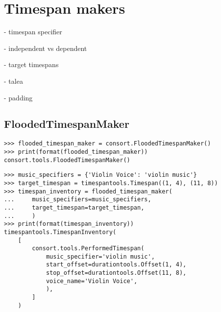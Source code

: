 \section{Timespan makers}

- timespan specifier

- independent vs dependent

- target timespans

- talea

- padding

\subsection{FloodedTimespanMaker} %

\begin{comment}
<abjad>
flooded_timespan_maker = consort.FloodedTimespanMaker()
print(format(flooded_timespan_maker))
</abjad>
\end{comment}

\begin{singlespacing}
\vspace{-0.5\baselineskip}
\begin{lstlisting}
>>> flooded_timespan_maker = consort.FloodedTimespanMaker()
>>> print(format(flooded_timespan_maker))
consort.tools.FloodedTimespanMaker()
\end{lstlisting}
\end{singlespacing}

\begin{comment}
<abjad>
music_specifiers = {'Violin Voice': 'violin music'}
target_timespan = timespantools.Timespan((1, 4), (11, 8))
timespan_inventory = flooded_timespan_maker(
    music_specifiers=music_specifiers,
    target_timespan=target_timespan,
    )
print(format(timespan_inventory))
</abjad>
\end{comment}

\begin{singlespacing}
\vspace{-0.5\baselineskip}
\begin{lstlisting}
>>> music_specifiers = {'Violin Voice': 'violin music'}
>>> target_timespan = timespantools.Timespan((1, 4), (11, 8))
>>> timespan_inventory = flooded_timespan_maker(
...     music_specifiers=music_specifiers,
...     target_timespan=target_timespan,
...     )
>>> print(format(timespan_inventory))
timespantools.TimespanInventory(
    [
        consort.tools.PerformedTimespan(
            music_specifier='violin music',
            start_offset=durationtools.Offset(1, 4),
            stop_offset=durationtools.Offset(11, 8),
            voice_name='Violin Voice',
            ),
        ]
    )
\end{lstlisting}
\end{singlespacing}

